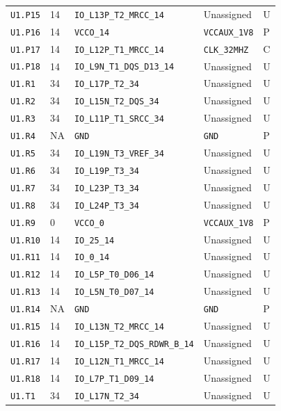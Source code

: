 \documentclass[11pt,a4paper]{article}
\begin{document}
\begin{longtable}{@{}P{20mm}P{10mm}P{70mm}P{51mm}P{11mm}@{}}
\nolinkurl{U1.P15} & 14 & \nolinkurl{IO_L13P_T2_MRCC_14} & Unassigned & U \\
\nolinkurl{U1.P16} & 14 & \nolinkurl{VCCO_14} & \nolinkurl{VCCAUX_1V8} & P \\
\nolinkurl{U1.P17} & 14 & \nolinkurl{IO_L12P_T1_MRCC_14} & \nolinkurl{CLK_32MHZ} & C \\
\nolinkurl{U1.P18} & 14 & \nolinkurl{IO_L9N_T1_DQS_D13_14} & Unassigned & U \\
\nolinkurl{U1.R1} & 34 & \nolinkurl{IO_L17P_T2_34} & Unassigned & U \\
\nolinkurl{U1.R2} & 34 & \nolinkurl{IO_L15N_T2_DQS_34} & Unassigned & U \\
\nolinkurl{U1.R3} & 34 & \nolinkurl{IO_L11P_T1_SRCC_34} & Unassigned & U \\
\nolinkurl{U1.R4} & NA & \nolinkurl{GND} & \nolinkurl{GND} & P \\
\nolinkurl{U1.R5} & 34 & \nolinkurl{IO_L19N_T3_VREF_34} & Unassigned & U \\
\nolinkurl{U1.R6} & 34 & \nolinkurl{IO_L19P_T3_34} & Unassigned & U \\
\nolinkurl{U1.R7} & 34 & \nolinkurl{IO_L23P_T3_34} & Unassigned & U \\
\nolinkurl{U1.R8} & 34 & \nolinkurl{IO_L24P_T3_34} & Unassigned & U \\
\nolinkurl{U1.R9} & 0 & \nolinkurl{VCCO_0} & \nolinkurl{VCCAUX_1V8} & P \\
\nolinkurl{U1.R10} & 14 & \nolinkurl{IO_25_14} & Unassigned & U \\
\nolinkurl{U1.R11} & 14 & \nolinkurl{IO_0_14} & Unassigned & U \\
\nolinkurl{U1.R12} & 14 & \nolinkurl{IO_L5P_T0_D06_14} & Unassigned & U \\
\nolinkurl{U1.R13} & 14 & \nolinkurl{IO_L5N_T0_D07_14} & Unassigned & U \\
\nolinkurl{U1.R14} & NA & \nolinkurl{GND} & \nolinkurl{GND} & P \\
\nolinkurl{U1.R15} & 14 & \nolinkurl{IO_L13N_T2_MRCC_14} & Unassigned & U \\
\nolinkurl{U1.R16} & 14 & \nolinkurl{IO_L15P_T2_DQS_RDWR_B_14} & Unassigned & U \\
\nolinkurl{U1.R17} & 14 & \nolinkurl{IO_L12N_T1_MRCC_14} & Unassigned & U \\
\nolinkurl{U1.R18} & 14 & \nolinkurl{IO_L7P_T1_D09_14} & Unassigned & U \\
\nolinkurl{U1.T1} & 34 & \nolinkurl{IO_L17N_T2_34} & Unassigned & U \\

\end{longtable}
\end{document}
